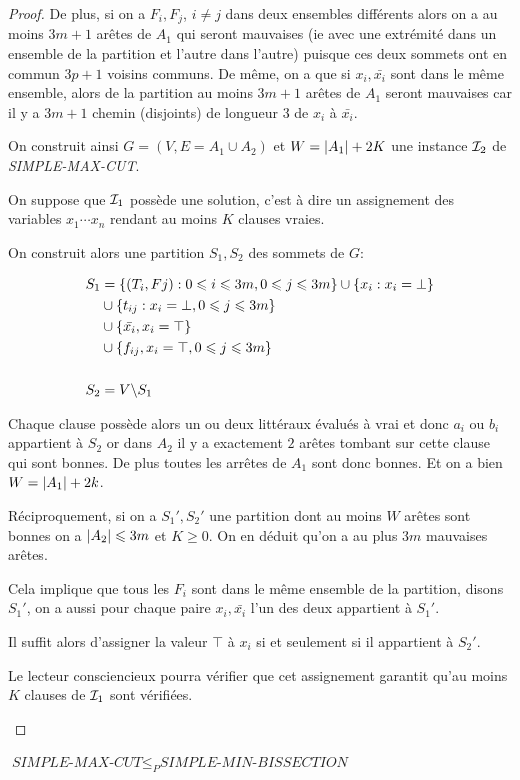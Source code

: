 \documentclass{standalone}
\begin{document}
\begin{proof}
	De plus, si on a $F_i, F_j$, $i \not= j$ dans deux ensembles différents alors on a au moins $3m+1$ arêtes de $A_1$ qui seront mauvaises (ie avec une extrémité dans un ensemble de la partition et l'autre dans l'autre) puisque ces deux sommets ont en commun $3p+1$ voisins communs. De même, on a que si $x_i, \bar{x_i}$  sont dans le même ensemble, alors de la partition au moins $3m+1$ arêtes de $A_1$ seront mauvaises car il y a $3m+1$ chemin (disjoints) de longueur 3 de $x_i$ à $\bar{x_i}$.
	
	
	On construit ainsi $G=(V, E=A_1 \cup A_2)$ et $W = \left| A_1\right| + 2K$ une instance $\mathcal I_2$ de \textit{SIMPLE-MAX-CUT}.
	
	On suppose que $\mathcal I_1$ possède une solution, c'est à dire un assignement des variables $x_1 \cdots x_n$ rendant au moins $K$ clauses vraies.
	
	On construit alors une partition $S_1, S_2$ des sommets de $G$:
	
	\begin{align*}
		S_1 &= \left\{ (T_i, Fj) : 0 \leqslant i \leqslant 3m, 0 \leqslant j \leqslant 3m \right\}
		\cup \left\{ x_i : x_i = \bot\right\} \\
		&\cup \left\{ t_{ij} : x_i = \bot, 0 \leqslant j \leqslant 3m \right\} \\
		&\cup \left\{ \bar{x_i}, x_i = \top\right\} \\
		&\cup\left\{ f_{ij}, x_i = \top,  0 \leqslant j \leqslant 3m\right\} \\ \\
		S_2 &= V \backslash S_1
	\end{align*}
	
	Chaque clause possède alors un ou deux littéraux évalués à vrai et donc $a_i$ ou $b_i$ appartient à $S_2$ or dans $A_2$ il y a exactement $2$ arêtes tombant sur cette clause qui sont bonnes. De plus toutes les arrêtes de $A_1$ sont donc bonnes. Et on a bien $W = \left| A_1\right| + 2k$.
	
	Réciproquement, si on a $S_1', S_2'$ une partition dont au moins $W$ arêtes sont bonnes on a $\left| A_2\right| \leqslant 3m$ et $K \geq 0$. On en déduit qu'on a au plus $3m$ mauvaises arêtes.
	
	Cela implique que tous les $F_i$ sont dans le même ensemble de la partition, disons $S_1'$, on a aussi pour chaque paire $x_i, \bar{x_i}$ l'un des deux appartient à $S_1'$.
	
	Il suffit alors d'assigner la valeur $\top$ à $x_i$ si et seulement si il appartient à $S_2'$.
	
	\begin{exercice}
		Le lecteur consciencieux pourra vérifier que cet assignement garantit qu'au moins $K$ clauses de $\mathcal I_1$ sont vérifiées.
	\end{exercice}
\end{proof}
\begin{thm}
	$\textit{SIMPLE-MAX-CUT} \leq_P \textit{SIMPLE-MIN-BISSECTION}$
\end{thm}
\end{document}
